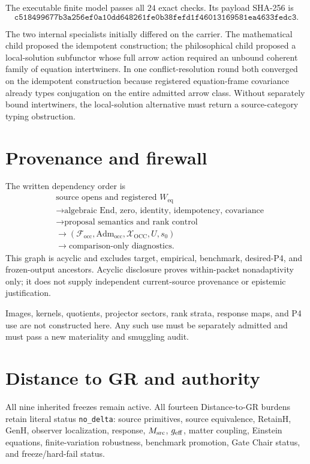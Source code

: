 \documentclass[11pt]{article}
\newcommand{\Focc}{\mathcal F_{\mathrm{occ}}}
\newcommand{\Adm}{\mathrm{Adm}_{\mathrm{occ}}}
\newcommand{\Xocc}{\mathcal X_{\mathrm{OCC}}}
\newcommand{\Weq}{W_{\mathrm{eq}}}
\begin{document}
The executable finite model passes all $24$ exact checks. Its payload SHA-256
is
\[
\texttt{c518499677b3a256ef0a10dd648261fe0b38fefd1f46013169581ea4633fedc3}.
\]

The two internal specialists initially differed on the carrier. The
mathematical child proposed the idempotent construction; the philosophical
child proposed a local-solution subfunctor whose full arrow action required an
unbound coherent family of equation intertwiners. In one conflict-resolution
round both converged on the idempotent construction because registered
equation-frame covariance already types conjugation on the entire admitted
arrow class. Without separately bound intertwiners, the local-solution
alternative must return a source-category typing obstruction.

\section{Provenance and firewall}

The written dependency order is
\[
\begin{split}
 &\text{source opens and registered }\Weq\\
 &\longrightarrow\text{algebraic End, zero, identity, idempotency, covariance}\\
 &\longrightarrow\text{proposal semantics and rank control}\\
 &\longrightarrow(\Focc,\Adm,\Xocc,U,s_0)\\
 &\longrightarrow\text{comparison-only diagnostics}.
\end{split}
\]
This graph is acyclic and excludes target, empirical, benchmark, desired-P4,
and frozen-output ancestors. Acyclic disclosure proves within-packet
nonadaptivity only; it does not supply independent current-source provenance
or epistemic justification.

Images, kernels, quotients, projector sectors, rank strata, response maps, and
P4 use are not constructed here. Any such use must be separately admitted and
must pass a new materiality and smuggling audit.

\section{Distance to GR and authority}

All nine inherited freezes remain active. All fourteen Distance-to-GR burdens
retain literal status \texttt{no\_delta}: source primitives, source
equivalence, RetainH, GenH, observer localization, response, $M_{\rm src}$,
$g_{\rm eff}$, matter coupling, Einstein equations, finite-variation
robustness, benchmark promotion, Gate Chair status, and freeze/hard-fail
status.
\end{document}
